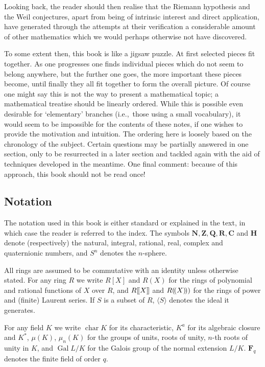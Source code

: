 \documentclass[10pt]{article}
\theoremstyle{definition}
\def\ldb{[\mkern-2mu[}
\def\rdb{]\mkern-2mu]}
\def\ldp{(\mkern-2.5mu(}
\def\rdp{)\mkern-2.5mu)}
\def\NN{\mathbf{N}}
\def\ZZ{\mathbf{Z}}
\def\QQ{\mathbf{Q}}
\def\RR{\mathbf{R}}
\def\CC{\mathbf{C}}
\def\HH{\mathbf{H}}
\def\FF{\mathbf{F}}
\DeclareMathOperator{\chr}{char}
\DeclareMathOperator{\Gal}{Gal}
\def\qw#1{`#1'}
\begin{document}
Looking back, the reader should then realise that the Riemann hypothesis and the Weil conjectures, apart from being of intrinsic interest and direct application, have generated through the attempts at their verification a considerable amount of other mathematics which we would perhaps otherwise not have discovered.

To some extent then, this book is like a jigsaw puzzle.
At first selected pieces fit together.
As one progresses one finds individual pieces which do not seem to belong anywhere, but the further one goes, the more important these pieces become, until finally they all fit together to form the overall picture.
Of course one might say this is not the way to present a mathematical topic; a mathematical treatise should be linearly ordered.
While this is possible even desirable for \qw{elementary} branches (i.e.,~those using a small vocabulary), it would seem to be impossible for the contents of these notes, if one wishes to provide the motivation and intuition.
The ordering here is loosely based on the chronology of the subject.
Certain questions may be partially answered in one section, only to be resurrected in a later section and tackled again with the aid of techniques developed in the meantime.
One final comment: because of this approach, this book should not be read once!


\subsection*{Notation}

The notation used in this book is either standard or explained in the text, in which case the reader is referred to the index.
The symbols $\NN, \ZZ, \QQ, \RR, \CC$ and $\HH$ denote (respectively) the natural, integral, rational, real, complex and quaternionic numbers, and $S^n$ denotes the $n$-sphere.

All rings are assumed to be commutative with an identity unless otherwise stated.
For any ring $R$ we write $R[X]$ and $R(X)$ for the rings of polynomial and rational functions of $X$ over $R$, and $R\ldb X \rdb$ and $R\ldp X \rdp)$ for the rings of power and (finite) Laurent series.
If $S$ is a subset of $R$, $\langle S \rangle$ denotes the ideal it generates.

For any field $K$ we write $\chr K$ for its characteristic, $K^a$ for its algebraic closure and $K^*$, $\mu(K)$, $\mu_n(K)$ for the groups of units, roots of unity, $n$-th roots of unity in $K$, and $\Gal L/K$ for the Galois group of the normal extension $L/K$.
$\FF_q$ denotes the finite field of order $q$.
\end{document}
